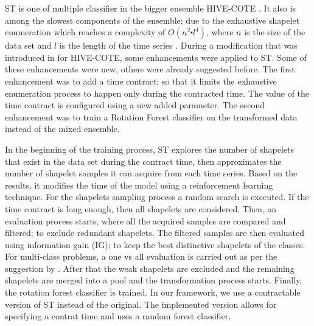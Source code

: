 ST is one of multiple classifier in the bigger ensemble HIVE-COTE \cite{lines2018time}.
It also is among the slowest components of the ensemble; due to the exhaustive shapelet enumeration which reaches a complexity of $O(n^{2} \centerdot l^{4})$,
where $n$ is the size of the data set and $l$ is the length of the time series \cite{shifaz2020ts}.
During a modification that was introduced in \cite{bagnall2020tale} for HIVE-COTE, some enhancements were applied to ST.
Some of these enhancements were new, others were already suggested before.
The first enhancement was to add a time contract; so that it limits the exhaustive enumeration process to happen only during the contracted time.
The value of the time contract is configured using a new added parameter.
The second enhancement was to train a Rotation Forest classifier on the transformed data instead of the mixed ensemble.

In the beginning of the training process, ST explores the number of shapelets that exist in the data set during the contract time, then approximates the number of shapelet
samples it can acquire from each time series.
Based on the results, it modifies the time of the model using a reinforcement learning technique.
For the shapelets sampling process a random search is executed. If the time contract is long enough, then all shapelets are considered.
Then, an evaluation process starts, where all the acquired samples are compared and filtered; to exclude redundant shapelets.
The filtered samples are then evaluated using information gain (IG); to keep the best distinctive shapelets of the classes.
For multi-class problems, a one vs all evaluation is carried out as per the suggestion by \cite{Bostrom2017}.
After that the weak shapelets are excluded and the remaining shapelets are merged into a pool and the transformation process starts.
Finally, the rotation forest classifier is trained.
In our framework, we use a contractable version of ST instead of the original. The implemented version allows for specifying a contrat time
and uses a random forest classifier.